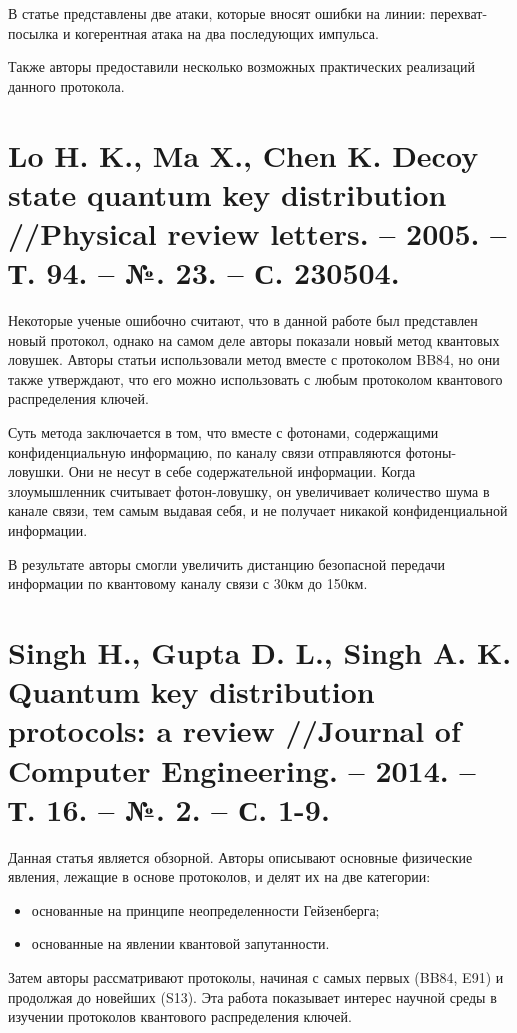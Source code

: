 В статье представлены две атаки, которые вносят ошибки на линии: перехват-посылка и когерентная атака на два последующих импульса.

Также авторы предоставили несколько возможных практических реализаций данного протокола.


\section{Lo H. K., Ma X., Chen K. Decoy state quantum key distribution //Physical review letters. – 2005. – Т. 94. – №. 23. – С. 230504.}
Некоторые ученые ошибочно считают, что в данной \cite{lo2005decoy} работе был представлен новый протокол, однако на самом деле авторы показали новый метод квантовых ловушек. Авторы статьи использовали метод вместе с протоколом BB84, но они также утверждают, что его можно использовать с любым протоколом квантового распределения ключей.

Суть метода заключается в том, что вместе с фотонами, содержащими конфиденциальную информацию, по каналу связи отправляются фотоны-ловушки. Они не несут в себе содержательной информации. Когда злоумышленник считывает фотон-ловушку, он увеличивает количество шума в канале связи, тем самым выдавая себя, и не получает никакой конфиденциальной информации.

В результате авторы смогли увеличить дистанцию безопасной передачи информации по квантовому каналу связи с 30км до 150км.

\section{Singh H., Gupta D. L., Singh A. K. Quantum key distribution protocols: a review //Journal of Computer Engineering. – 2014. – Т. 16. – №. 2. – С. 1-9.}
Данная статья \cite{singh2014quantum} является обзорной. Авторы описывают основные физические явления, лежащие в основе протоколов, и делят их на две категории:
\begin{itemize}
	\item основанные на принципе неопределенности Гейзенберга;
	\item основанные на явлении квантовой запутанности.
\end{itemize}

Затем авторы рассматривают протоколы, начиная с самых первых (BB84, E91) и продолжая до новейших (S13). Эта работа показывает интерес научной среды в изучении протоколов квантового распределения ключей.

